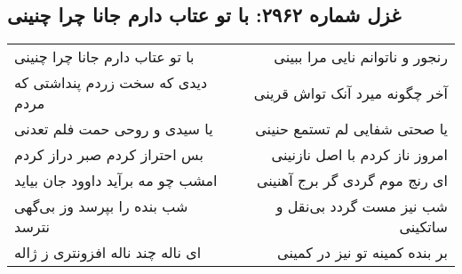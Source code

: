 \begin{center}
\section*{غزل شماره ۲۹۶۲: با تو عتاب دارم جانا چرا چنینی}
\label{sec:2962}
\begin{longtable}{l p{0.5cm} r}
با تو عتاب دارم جانا چرا چنینی
&&
رنجور و ناتوانم نایی مرا ببینی
\\
دیدی که سخت زردم پنداشتی که مردم
&&
آخر چگونه میرد آنک تواش قرینی
\\
یا سیدی و روحی حمت فلم تعدنی
&&
یا صحتی شفایی لم تستمع حنینی
\\
بس احتراز کردم صبر دراز کردم
&&
امروز ناز کردم با اصل نازنینی
\\
امشب چو مه برآید داوود جان بیاید
&&
ای رنج موم گردی گر برج آهنینی
\\
شب بنده را بپرسد وز بی‌گهی نترسد
&&
شب نیز مست گردد بی‌نقل و ساتکینی
\\
ای ناله چند ناله افزونتری ز ژاله
&&
بر بنده کمینه تو نیز در کمینی
\\
\end{longtable}
\end{center}

